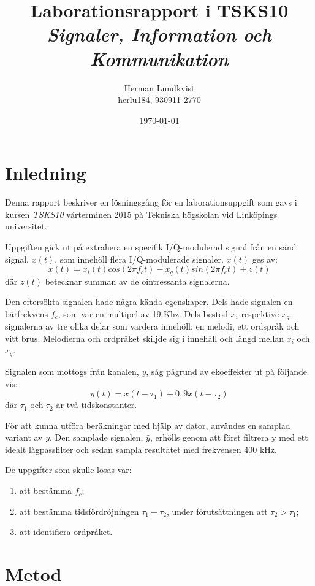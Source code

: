\documentclass[10pt,twocolumn]{article}
\title{Laborationsrapport i TSKS10 \emph{Signaler, Information och Kommunikation}}
\author{Herman Lundkvist \\ herlu184, 930911-2770 }
\date{\today}
\begin{document}
\maketitle

\section{Inledning}

Denna rapport beskriver en lösningsgång för en laborationsuppgift som gavs i
kursen \emph{TSKS10} vårterminen 2015 på Tekniska högskolan vid Linköpings
universitet.

Uppgiften gick ut på extrahera en specifik I/Q-modulerad signal från en sänd
signal, $x(t)$, som innehöll flera I/Q-modulerade signaler. $x(t)$ ges av:
\begin{equation}
x(t) = x_i(t) cos(2 \pi f_ct) - x_q(t) sin(2 \pi f_c t) + z(t)
\label{e1}
\end{equation}
där $z(t)$ betecknar summan av de ointressanta signalerna.

Den eftersökta signalen hade några kända egenskaper. Dels hade signalen en
bärfrekvens $f_c$, som var en multipel av 19 Khz. Dels bestod $x_i$ respektive
$x_q$-signalerna av tre olika delar som vardera innehöll: en melodi, ett ordspråk
och vitt brus. Melodierna och ordpråket skiljde sig i
innehåll och längd mellan $x_i$ och $x_q$.

Signalen som mottogs från kanalen, $y$, såg pågrund av ekoeffekter ut på
följande vis:
\begin{equation}
    y(t)=x(t - \tau_1) + 0,9 x(t - \tau_2)
\end{equation}
där $\tau_1$ och $\tau_2$ är två tidskonstanter.

För att kunna utföra beräkningar med hjälp av dator, användes en samplad
variant av $y$. Den samplade signalen, $\hat{y}$, erhölls genom att först
filtrera y med ett idealt lågpassfilter och sedan sampla resultatet med
frekvensen 400 kHz.

De uppgifter som skulle lösas var:
\begin{enumerate}
\item att bestämma $f_c$;
\item att bestämma tidsfördröjningen $\tau_1-\tau_2$, under förutsättningen att
$\tau_2 > \tau_1$;
\item att identifiera ordpråket.
\end{enumerate}

\section{Metod}
\end{document}
